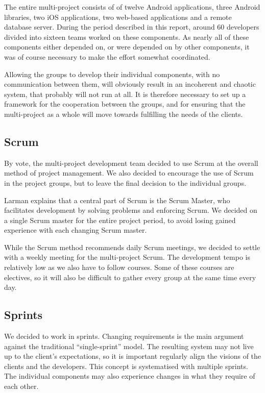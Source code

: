The entire \giraf multi-project consists of of twelve Android applications, three Android libraries, two iOS applications, two web-based applications and a remote database server.
During the period described in this report, around 60 developers divided into sixteen teams worked on these components. 
As nearly all of these components either depended on, or were depended on by other components, it was of course necessary to make the effort somewhat coordinated. 

Allowing the groups to develop their individual components, with no communication between them, will obviously result in an incoherent and chaotic system, that probably will not run at all. 
It is therefore necessary to set up a framework for the cooperation between the groups, and for ensuring that the multi-project as a whole will move towards fulfilling the needs of the clients.

\subsection{Scrum}
By vote, the multi-project development team decided to use Scrum at the overall method of project management. 
We also decided to encourage the use of Scrum in the project groups, but to leave the final decision to the individual groups. 

Larman \cite{larmanAgile} explains that a central part of Scrum is the Scrum Master, who facilitates development by solving problems and enforcing Scrum. We decided on a single Scrum master for the entire project period, to avoid losing gained experience with each changing Scrum master.

While the Scrum method recommends daily Scrum meetings, we decided to settle with a weekly meeting for the multi-project Scrum. The development tempo is relatively low as we also have to follow courses. Some of these courses are electives, so it will also be difficult to gather every group at the same time every day.

\subsection{Sprints}
We decided to work in sprints. Changing requirements is the main argument against the traditional ``single-sprint'' model. The resulting system may not live up to the client's expectations, so it is important regularly align the visions of the clients and the developers. This concept is systematised with multiple sprints. The individual components may also experience changes in what they require of each other.

